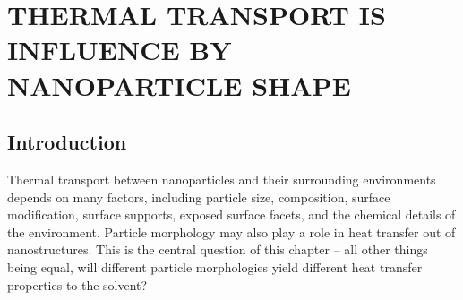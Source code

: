 \chapter{THERMAL TRANSPORT IS INFLUENCE BY NANOPARTICLE SHAPE}\label{chap:morph}


\section{Introduction}
Thermal transport between nanoparticles and their surrounding
environments depends on many factors, including particle
size,\cite{Zanjani2014,Liu2015,Wilhelmsen2015,Stocker2016,Tascini2016}
composition,\cite{Wilson:2002uq, Ge:2004yg,Ong:2013rt} surface
modification,\cite{Ge:2004yg,kuang:AuThl,Ong:2013rt,Ong:2014yq,Liu2015,Stocker2016,Hannah2015,Park2016,Meng:2017,Leitner2017}
surface supports,\cite{Schmidt:2010,Park2012} exposed surface
facets,\cite{Norris:2013,Hannah2015,Han:2017} and the chemical details
of the
environment.\cite{Ge2006,Schmidt:2010,Park2012,Ong:2013rt,Ong:2014yq,Wilhelmsen2015,Giri:2016,Park2016,Bhanushali:2017,Yadav:2017}
Particle morphology may also play a role in heat transfer out of
nanostructures.  This is the central question of this chapter -- all
other things being equal, will different particle morphologies yield
different heat transfer properties to the solvent?

